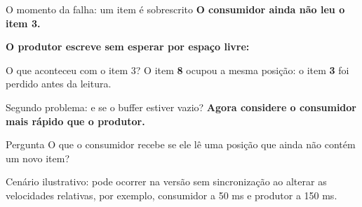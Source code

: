 \documentclass[aspectratio=169,11pt]{beamer}
\newcommand{\caixa}[3]{%
\node[draw=#3,very thick,minimum width=1.45cm,minimum height=1.15cm,
  fill=#3!8,font=\Large\bfseries] at (#1,0) {#2};
\node[below=0.72cm,font=\footnotesize\color{cinza}] at (#1,0) {#1};}
\begin{document}
\begin{frame}{O momento da falha: um item é sobrescrito}
\centering
\textbf{O consumidor ainda não leu o item 3.}\par
\vspace{0.45em}
\vspace{0.65em}
\textcolor{vermelhoerro}{\bfseries O produtor escreve sem esperar por espaço livre:}\par
\vspace{0.25em}
\vspace{0.7em}
\begin{alertblock}{O que aconteceu com o item 3?}
O item \textbf{8} ocupou a mesma posição: o item \textbf{3} foi perdido antes da leitura.
\end{alertblock}
\end{frame}



\begin{frame}{Segundo problema: e se o buffer estiver vazio?}
\centering
\textbf{Agora considere o consumidor mais rápido que o produtor.}\par
\vspace{0.6em}
\vspace{1.0em}
\begin{alertblock}{Pergunta}
O que o consumidor recebe se ele lê uma posição que ainda não contém um novo item?
\end{alertblock}
\vfill
\footnotesize\textcolor{cinza}{Cenário ilustrativo: pode ocorrer na versão sem sincronização ao alterar as velocidades relativas, por exemplo, consumidor a 50 ms e produtor a 150 ms.}
\end{frame}
\end{document}
